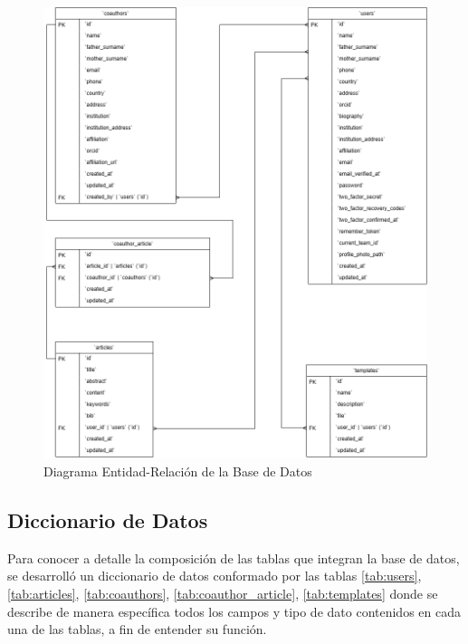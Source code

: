 \begin{figure}[H]
    \centering
    \includegraphics[width=1\textwidth]{IMAGENES/entidad-relacion.png}
    \caption{Diagrama Entidad-Relación de la Base de Datos}
\label{fig:diagrama-er}
\end{figure}

\subsection{Diccionario de Datos}
Para conocer a detalle la composición de las tablas que integran la base de datos, se desarrolló un diccionario de datos conformado por las tablas \ref{tab:users}, \ref{tab:articles}, \ref{tab:coauthors}, \ref{tab:coauthor_article}, \ref{tab:templates} donde se describe de manera específica todos los campos y tipo de dato contenidos en cada una de las tablas, a fin de entender su función.

